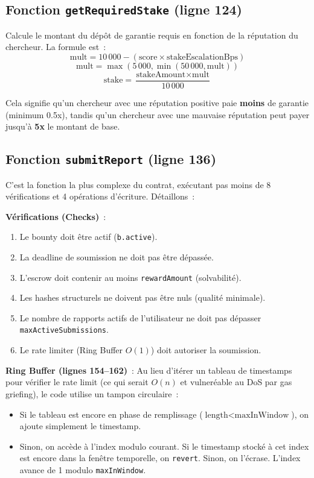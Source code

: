 \documentclass[12pt, a4paper]{report}
\begin{document}
\subsection{Fonction \texttt{getRequiredStake} (ligne 124)}
Calcule le montant du d\'{e}p\^{o}t de garantie requis en fonction de la r\'{e}putation du chercheur. La formule est~:
$$\text{mult} = 10\,000 - (\text{score} \times \text{stakeEscalationBps})$$
$$\text{mult} = \max(5\,000, \min(50\,000, \text{mult}))$$
$$\text{stake} = \frac{\text{stakeAmount} \times \text{mult}}{10\,000}$$

Cela signifie qu'un chercheur avec une r\'{e}putation positive paie \textbf{moins} de garantie (minimum 0.5x), tandis qu'un chercheur avec une mauvaise r\'{e}putation peut payer jusqu'\`{a} \textbf{5x} le montant de base.

\subsection{Fonction \texttt{submitReport} (ligne 136)}
C'est la fonction la plus complexe du contrat, ex\'{e}cutant pas moins de 8 v\'{e}rifications et 4 op\'{e}rations d'\'{e}criture. D\'{e}taillons~:

\textbf{V\'{e}rifications (Checks)}~:
\begin{enumerate}
    \item Le bounty doit \^{e}tre actif (\texttt{b.active}).
    \item La deadline de soumission ne doit pas \^{e}tre d\'{e}pass\'{e}e.
    \item L'escrow doit contenir au moins \texttt{rewardAmount} (solvabilit\'{e}).
    \item Les hashes structurels ne doivent pas \^{e}tre nuls (qualit\'{e} minimale).
    \item Le nombre de rapports actifs de l'utilisateur ne doit pas d\'{e}passer \texttt{maxActiveSubmissions}.
    \item Le rate limiter (Ring Buffer $O(1)$) doit autoriser la soumission.
\end{enumerate}

\textbf{Ring Buffer (lignes 154--162)}~:
Au lieu d'it\'{e}rer un tableau de timestamps pour v\'{e}rifier le rate limit (ce qui serait $O(n)$ et vulner\'{e}able au DoS par gas griefing), le code utilise un tampon circulaire~:
\begin{itemize}
    \item Si le tableau est encore en phase de remplissage ($\text{length} < \text{maxInWindow}$), on ajoute simplement le timestamp.
    \item Sinon, on acc\`{e}de \`{a} l'index modulo courant. Si le timestamp stock\'{e} \`{a} cet index est encore dans la fen\^{e}tre temporelle, on \texttt{revert}. Sinon, on l'\'{e}crase. L'index avance de 1 modulo \texttt{maxInWindow}.
\end{itemize}
\end{document}
